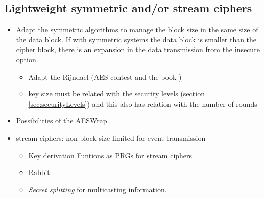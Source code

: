 \documentclass[10pt,a4paper,twoside]{llncs}
\begin{document}
\subsection{Lightweight symmetric and/or stream ciphers}
    \begin{itemize}
        \item Adapt the symmetric algorithms to manage the block size in the same size of the data block. If with symmetric systems the data block is smaller than the cipher block, there is an expansion in the data transmission from the insecure option.
        \begin{itemize}
            \item Adapt the Rijndael \cite{gRijndael} (AES contest \cite{AES-FIPS} and the book \cite{Daemen:2002:DR:560131})
            \item key size must be related with the security levels (section \ref{sec:securityLevels}) and this also has relation with the number of rounds
        \end{itemize}
        \item Possibilities of the AESWrap \cite{rfc3394}
        \item stream ciphers: non block size limited for event transmission
        \begin{itemize}
            \item Key derivation Funtions as PRGs for stream ciphers
            \item Rabbit \cite{rfc4503}
            \item \emph{Secret splitting} for multicasting information.
        \end{itemize}
    \end{itemize}

    
\end{document}
